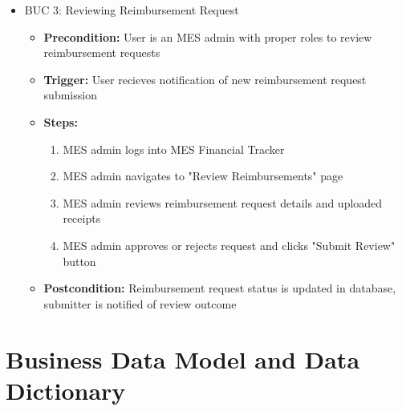 \documentclass[12pt]{article}
\begin{document}
\begin{itemize}
    \item BUC 3: Reviewing Reimbursement Request
      \begin{itemize}
        \item \textbf{Precondition:} User is an MES admin with proper roles to review reimbursement requests
        \item \textbf{Trigger:} User recieves notification of new reimbursement request submission
        \item \textbf{Steps:}
          \begin{enumerate}
            \item MES admin logs into MES Financial Tracker
            \item MES admin navigates to "Review Reimbursements" page
            \item MES admin reviews reimbursement request details and uploaded receipts
            \item MES admin approves or rejects request and clicks "Submit Review" button
          \end{enumerate}
        \item \textbf{Postcondition:} Reimbursement request status is updated in database, submitter is notified of review outcome 
      \end{itemize}
  \end{itemize}



\section{Business Data Model and Data Dictionary}
\end{document}
